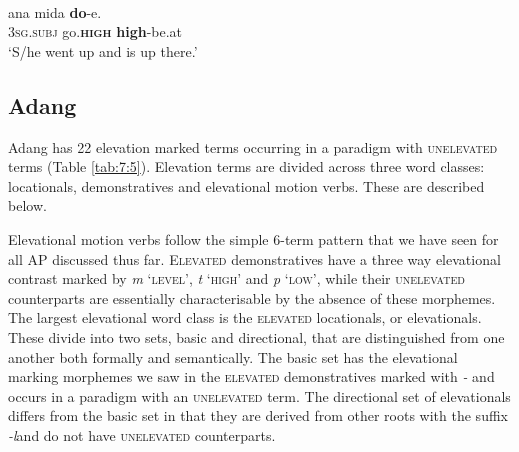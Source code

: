 \ea%
\label{ex:7:20}
 \\
\gll  {\textglotstop}ana  mida  \textbf{do}-{\textglotstop}e.  \\
  \textsc{3sg.subj} go.\textbf{\textsc{high}} \textbf{high}-be.at     \\
\glt   `S/he went up and is up there.'
\z







\subsection{Adang}\label{sec:7:3.5}
Adang has 22 elevation marked terms occurring in a paradigm with \textsc{unelevated} terms (Table \ref{tab:7:5}). Elevation terms are divided across three word classes: locationals, demonstratives and elevational motion verbs. These are described below.

Elevational motion verbs follow the simple 6-term pattern that we have seen for all AP discussed thus far. E\textsc{levated} demonstratives have a three way elevational contrast marked by \textit{m}\textit{{\textopeno}} `\textsc{level}', \textit{t}\textit{{\textopeno}} `\textsc{high}' and \textit{p}\textit{{\textopeno}} `\textsc{low}', while their \textsc{unelevated} counterparts are essentially characterisable by the absence of these morphemes. The largest elevational word class is the \textsc{elevated} locationals, or elevationals. These divide into two sets, basic and directional, that are distinguished from one another both formally and semantically. The basic set has the elevational marking morphemes we saw in the \textsc{elevated} demonstratives marked with \textit{{}-}\textit{{\ng}} and occurs in a paradigm with an \textsc{unelevated} term. The directional set of elevationals differs from the basic set in that they are derived from other roots with the suffix \textit{{}-l}\textit{{\textepsilon}}and do not have \textsc{unelevated} counterparts.
 

